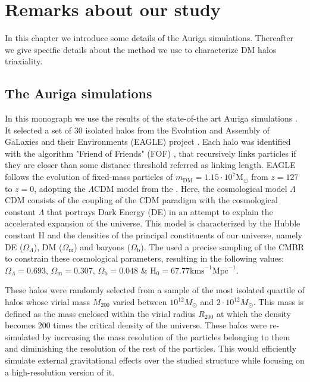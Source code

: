 \chapter{Remarks about our study}
In this chapter we introduce some details of the Auriga simulations. Thereafter we give specific details about the method we use to characterize DM halos triaxiality.\\

\section{The Auriga simulations}
In this monograph we use the results of the state-of-the art Auriga simulations \cite{auriga}. It selected a set of 30 isolated halos from the Evolution and Assembly of GaLaxies and their Environments (EAGLE) project \cite{Eagle}. Each halo was identified with the algorithm "Friend of Friends" (FOF) \cite{Davis_et_al._1985}, that recursively links particles if they are closer than some distance threshold referred as linking length. EAGLE follows the evolution of fixed-mass particles of $m_{\text{DM}} = 1.15\cdot 10^7\text{M}_{\odot}$ from $z=127$ to $z=0$, adopting the $\Lambda$CDM model from the \cite[Planck Collaboration et al. (2014)]{Planck_Collaboration_2014}. Here, the cosmological model $\Lambda$CDM consists of the coupling of the CDM paradigm with the cosmological constant $\Lambda$ that portrays Dark Energy (DE) in an attempt to explain the accelerated expansion of the universe. This model is characterized by the Hubble constant $\text{H}$ and the densities of the principal constituents of our universe, namely DE ($\Omega_\Lambda$), DM ($\Omega_\text{m}$) and baryons ($\Omega_\text{b}$). The \cite[Planck Collaboration et al. (2014)]{Planck_Collaboration_2014} used a precise sampling of the CMBR to constrain these cosmological parameters, resulting in the following values: $\Omega_\Lambda=0.693$, $\Omega_\text{m}=0.307$, $\Omega_\text{b}=0.048$ \& $\text{H}_0=67.77\text{kms} ^{-1}\text{Mpc}^{-1}$. 

These halos were randomly selected from a sample of the most isolated quartile of halos whose virial mass $M_{200}$ varied between $10^{12}M_\odot$ and $2\cdot 10^{12}M_\odot$. This mass is defined as the mass enclosed within the virial radius $R_{200}$ at which the density becomes 200 times the critical density of the universe. These halos were re-simulated by increasing the mass resolution of the particles belonging to them and diminishing the resolution of the rest of the particles. This would efficiently simulate external gravitational effects over the studied structure while focusing on a high-resolution version of it.\\

